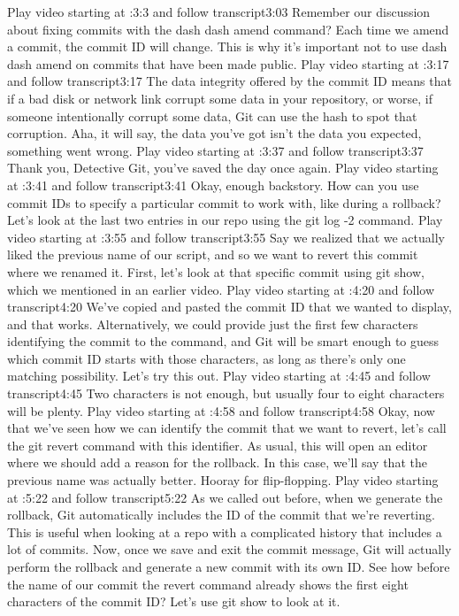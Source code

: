 	Play video starting at :3:3 and follow transcript3:03
	Remember our discussion about fixing commits with the dash dash amend command? Each time we amend a commit, the commit ID will change. This is why it's important not to use dash dash amend on commits that have been made public.
	Play video starting at :3:17 and follow transcript3:17
	The data integrity offered by the commit ID means that if a bad disk or network link corrupt some data in your repository, or worse, if someone intentionally corrupt some data, Git can use the hash to spot that corruption. Aha, it will say, the data you've got isn't the data you expected, something went wrong.
	Play video starting at :3:37 and follow transcript3:37
	Thank you, Detective Git, you've saved the day once again.
	Play video starting at :3:41 and follow transcript3:41
	Okay, enough backstory. How can you use commit IDs to specify a particular commit to work with, like during a rollback? Let's look at the last two entries in our repo using the git log -2 command.
	Play video starting at :3:55 and follow transcript3:55
	Say we realized that we actually liked the previous name of our script, and so we want to revert this commit where we renamed it. First, let's look at that specific commit using git show, which we mentioned in an earlier video.
	Play video starting at :4:20 and follow transcript4:20
	We've copied and pasted the commit ID that we wanted to display, and that works. Alternatively, we could provide just the first few characters identifying the commit to the command, and Git will be smart enough to guess which commit ID starts with those characters, as long as there's only one matching possibility. Let's try this out.
	Play video starting at :4:45 and follow transcript4:45
	Two characters is not enough, but usually four to eight characters will be plenty.
	Play video starting at :4:58 and follow transcript4:58
	Okay, now that we've seen how we can identify the commit that we want to revert, let's call the git revert command with this identifier. As usual, this will open an editor where we should add a reason for the rollback. In this case, we'll say that the previous name was actually better. Hooray for flip-flopping.
	Play video starting at :5:22 and follow transcript5:22
	As we called out before, when we generate the rollback, Git automatically includes the ID of the commit that we're reverting. This is useful when looking at a repo with a complicated history that includes a lot of commits. Now, once we save and exit the commit message, Git will actually perform the rollback and generate a new commit with its own ID. See how before the name of our commit the revert command already shows the first eight characters of the commit ID? Let's use git show to look at it.
